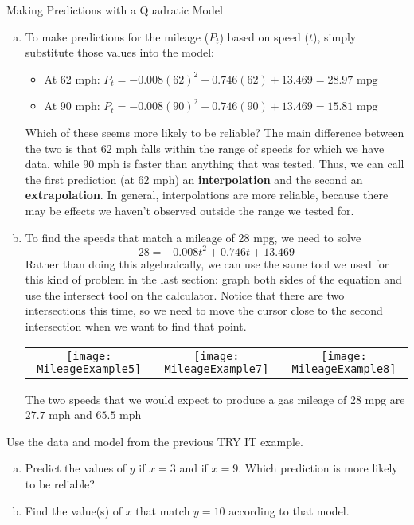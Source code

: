 \begin{example}{Making Predictions with a Quadratic Model}
\begin{enumerate}[(a)]
\item To make predictions for the mileage ($P_t$) based on speed ($t$), simply substitute those values into the model:
\begin{itemize}
\item At 62 mph: $P_t = -0.008(62)^2 + 0.746(62) + 13.469 = \boxed{28.97 \textrm{ mpg}}$
\item At 90 mph: $P_t = -0.008(90)^2 + 0.746(90) + 13.469 = \boxed{15.81 \textrm{ mpg}}$
\end{itemize}

Which of these seems more likely to be reliable?  The main difference between the two is that 62 mph falls within the range of speeds for which we have data, while 90 mph is faster than anything that was tested.  Thus, we can call the first prediction (at 62 mph) an \textbf{interpolation} and the second an \textbf{extrapolation}.  In general, interpolations are more reliable, because there may be effects we haven't observed outside the range we tested for.

\item To find the speeds that match a mileage of 28 mpg, we need to solve
\[28 = -0.008t^2 + 0.746t + 13.469\]
Rather than doing this algebraically, we can use the same tool we used for this kind of problem in the last section: graph both sides of the equation and use the intersect tool on the calculator.  Notice that there are two intersections this time, so we need to move the cursor close to the second intersection when we want to find that point.
\begin{center}
\begin{tabular}{c c c}
\texttt{[image: MileageExample5]}
& \texttt{[image: MileageExample7]}
& \texttt{[image: MileageExample8]}
\end{tabular}
\end{center}

The two speeds that we would expect to produce a gas mileage of 28 mpg are $\boxed{27.7 \textrm{ mph}}$ and $\boxed{65.5 \textrm{ mph}}$
\end{enumerate}
\end{example}

\begin{try}
Use the data and model from the previous TRY IT example.

\begin{enumerate}[(a)]
\item Predict the values of $y$ if $x=3$ and if $x=9$.  Which prediction is more likely to be reliable?
\item Find the value(s) of $x$ that match $y=10$ according to that model.
\end{enumerate}
\end{try}

